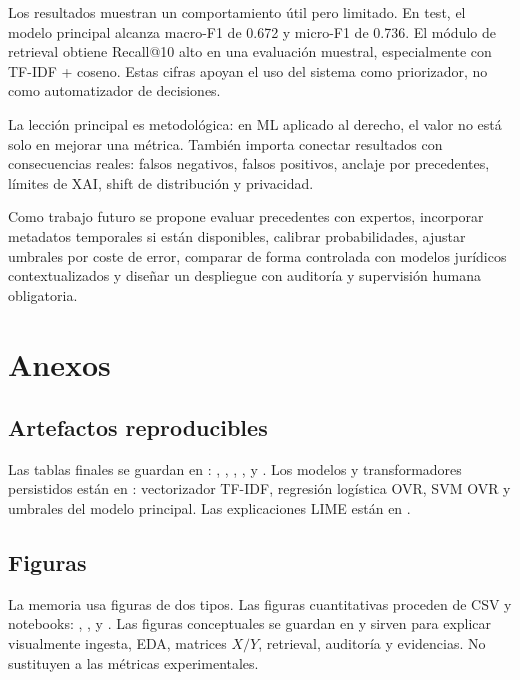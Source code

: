 \documentclass[11pt,a4paper]{article}
\begin{document}
Los resultados muestran un comportamiento útil pero limitado. En test, el modelo principal alcanza macro-F1 de 0.672 y micro-F1 de 0.736. El módulo de retrieval obtiene Recall@10 alto en una evaluación muestral, especialmente con TF-IDF + coseno. Estas cifras apoyan el uso del sistema como priorizador, no como automatizador de decisiones.

La lección principal es metodológica: en ML aplicado al derecho, el valor no está solo en mejorar una métrica. También importa conectar resultados con consecuencias reales: falsos negativos, falsos positivos, anclaje por precedentes, límites de XAI, shift de distribución y privacidad.

Como trabajo futuro se propone evaluar precedentes con expertos, incorporar metadatos temporales si están disponibles, calibrar probabilidades, ajustar umbrales por coste de error, comparar de forma controlada con modelos jurídicos contextualizados y diseñar un despliegue con auditoría y supervisión humana obligatoria.

\appendix
\section{Anexos}

\subsection{Artefactos reproducibles}

Las tablas finales se guardan en : , , , ,  y . Los modelos y transformadores persistidos están en : vectorizador TF-IDF, regresión logística OVR, SVM OVR y umbrales del modelo principal. Las explicaciones LIME están en .

\subsection{Figuras}

La memoria usa figuras de dos tipos. Las figuras cuantitativas proceden de CSV y notebooks: , ,  y . Las figuras conceptuales se guardan en  y sirven para explicar visualmente ingesta, EDA, matrices \(X/Y\), retrieval, auditoría y evidencias. No sustituyen a las métricas experimentales.
\end{document}
